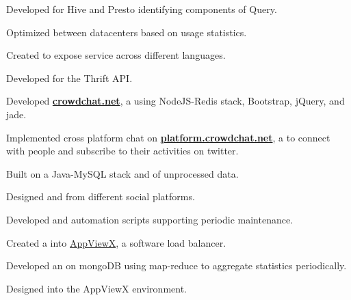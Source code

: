 \documentclass[]{bigfatnoob-resume}
\begin{document}
\begin{minipage}[t]{0.65\textwidth}
\begin{tightemize}
    \item Developed  for Hive and Presto identifying components of Query.
	\item Optimized  between datacenters based on usage statistics.
	\item Created  to expose service across different languages.
	\item Developed  for the Thrift API.
\end{tightemize}
\sectionsep

\begin{tightemize}
	\item Developed \textbf{\href{https://www.crowdchat.net/}{crowdchat.net}}, a  using NodeJS-Redis stack, Bootstrap, jQuery, and jade.
	\item Implemented cross platform chat on \textbf{\href{https://platform.crowdchat.net}{platform.crowdchat.net}}, a  to connect with people and subscribe to their activities on twitter. 
	\item Built  on a Java-MySQL stack and  of unprocessed data.
	\item Designed  and  from different social platforms.
	\item Developed  and automation scripts supporting periodic maintenance.
\end{tightemize}
\sectionsep

\begin{tightemize}
\item Created a  into \href{http://www.appviewx.com/}{AppViewX}, a software load balancer.
\item Developed an  on mongoDB using map-reduce to aggregate statistics periodically.
\item Designed  into the AppViewX environment.
\end{tightemize}
\sectionsep

\end{minipage} 
\newpage
\end{document}
